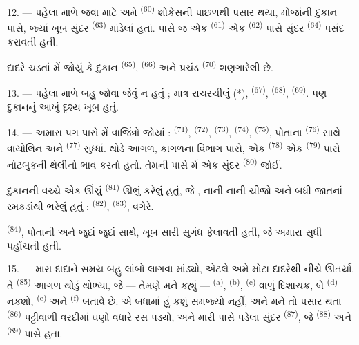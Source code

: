 12. --- પહેલા માળે જવા માટે અમે 
\textsuperscript{(60)} શોકેસની પાછળથી પસાર થયા, મોજાંની દુકાન પાસે,
જ્યાં ખૂબ સુંદર  \textsuperscript{(63)} માંડેલાં
હતાં. પાસે જ એક  \textsuperscript{(61)} એક
 \textsuperscript{(62)} પાસે સુંદર
 \textsuperscript{(64)} પસંદ કરાવતી હતી.

દાદરે ચડતાં મેં જોયું કે દુકાન 
\textsuperscript{(65)},  \textsuperscript{(66)} અને
પ્રચંડ  \textsuperscript{(70)} શણગારેલી છે.

13. --- પહેલા માળે બહુ જોવા જેવું ન હતું ; માત્ર રાચરચીલું (*),
 \textsuperscript{(67)}, 
\textsuperscript{(68)},  \textsuperscript{(69)}. પણ
દુકાનનું આખું દૃશ્ય ખૂબ  હતું.

14. --- અમારા પગ પાસે મેં વાજિંત્રો જોયાં : 
\textsuperscript{(71)},  \textsuperscript{(72)},
 \textsuperscript{(73)}, 
\textsuperscript{(74)},  \textsuperscript{(75)},
પોતાના  \textsuperscript{(76)} સાથે વાયોલિન અને
 \textsuperscript{(77)} સુધ્ધાં. થોડે આગળ, કાગળના
વિભાગ પાસે, એક  \textsuperscript{(78)} એક
 \textsuperscript{(79)} પાસે નોટબુકની થેલીનો ભાવ
કરતો હતો. તેમની પાસે મેં એક સુંદર 
\textsuperscript{(80)} જોઈ.

દુકાનની વચ્ચે એક ઊંચું  \textsuperscript{(81)}
ઊભું કરેલું હતું, જે , નાની નાની ચીજો અને બધી
જાતનાં રમકડાંથી ભરેલું હતું : 
\textsuperscript{(82)},  \textsuperscript{(83)}, વગેરે.

 \textsuperscript{(84)}, પોતાની  અને જુદાં જુદાં  સાથે, ખૂબ સારી સુગંધ ફેલાવતી
હતી, જે અમારા સુધી પહોંચતી હતી.

\VUsaut{3.4mm}
\VUsaut{2.8mm}

15. --- મારા દાદાને સમય બહુ લાંબો લાગવા માંડ્યો, એટલે અમે મોટા
દાદરેથી નીચે ઊતર્યા. તે  \textsuperscript{(85)}
આગળ થોડું થોભ્યા, જે — તેમણે મને કહ્યું — 
\textsuperscript{(a)}, 
\textsuperscript{(b)},  \textsuperscript{(c)}
 વાળું દિશાચક્ર, બે
 \textsuperscript{(d)} નકશો, 
\textsuperscript{(e)} અને  \textsuperscript{(f)}
બતાવે છે. એ બધામાં હું કશું સમજ્યો નહીં, અને મને તો પસાર થતા
 \textsuperscript{(86)} પટ્ટીવાળી
વરદીમાં ઘણો વધારે રસ પડ્યો, અને મારી પાસે પડેલા સુંદર 
\textsuperscript{(87)}, જે  \textsuperscript{(88)} અને
 \textsuperscript{(89)} પાસે હતા.

